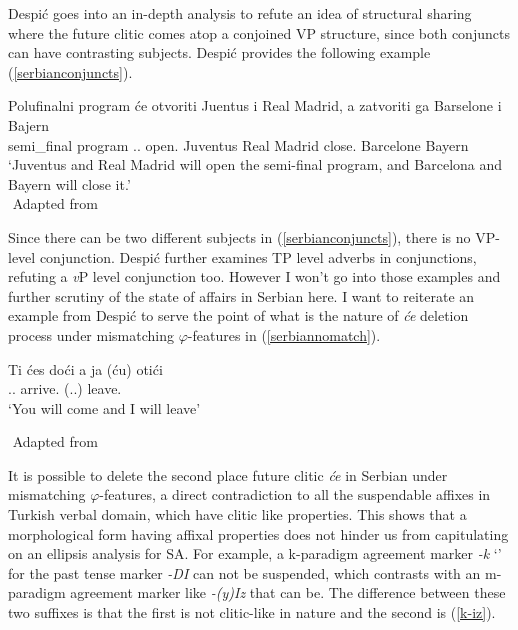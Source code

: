 Despi\'{c} goes into an in-depth analysis to refute an idea of structural sharing where the future clitic comes atop a conjoined VP structure, since both conjuncts can have contrasting subjects. Despi\'c provides the following example (\ref{serbianconjuncts}).

\begin{exe}
    \ex \label{serbianconjuncts}
    \gll 
    Polufinalni program  \'{c}e otvoriti Juentus i {Real Madrid,} a zatvoriti ga Barselone i Bajern \\ semi\_final program {\Aux}.{\Tsg}.{\Fut} open.{\Inf} Juventus {\And} {Real Madrid} {\And} close.{\Inf} {\Tsg} Barcelone {\And} Bayern \\
    \glt `Juventus and Real Madrid will open the semi-final program, and Barcelona and Bayern will close it.' \\
    ${}$ \hfill Adapted from \cite{despic2017suspended}
\end{exe}

Since there can be two different subjects in (\ref{serbianconjuncts}), there is no VP-level conjunction. Despi\'c further examines TP level adverbs in conjunctions, refuting a \textit{v}P level conjunction too. However I won't go into those examples and further scrutiny of the state of affairs in Serbian here. I want to reiterate an example from Despi\'c to serve the point of what is the nature of \textit{\'ce} deletion process under mismatching $\varphi$-features in (\ref{serbiannomatch}).

\begin{exe}
    \ex \label{serbiannomatch}
    \begin{xlist}
        \ex \gll 
        Ti \'{c}es do\'{c}i a ja (\'{c}u) oti\'{c}i \\ {\Ssg} {\Aux}.{\Ssg}.{\Fut} arrive.{\Inf} {\And} {\Fsg} ({\Aux}.{\Fsg}.{\Fut}) leave.{\Inf} \\
        \glt `You will come and I will leave'
    \end{xlist}
    ${}$ \hfill Adapted from \cite{despic2017suspended}
\end{exe}

It is possible to delete the second place future clitic \textit{\'ce} in Serbian under mismatching $\varphi$-features, a direct contradiction to all the suspendable affixes in Turkish verbal domain, which have clitic like properties. This shows that a morphological form having affixal properties does not hinder us from capitulating on an ellipsis analysis for SA. For example, a k-paradigm agreement marker \textit{-k} `{\Fpl}' for the past tense marker \textit{-DI} can not be suspended, which contrasts with an m-paradigm agreement marker like \textit{-(y)Iz} that can be. The difference between these two suffixes is that the first is not clitic-like in nature and the second is (\ref{k-iz}).

